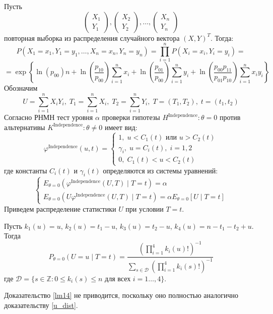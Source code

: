 Пусть
    $$
        \begin{pmatrix}
            X_1 \\
            Y_1 
        \end{pmatrix},
        \begin{pmatrix}
            X_2 \\
            Y_2
        \end{pmatrix}, \ldots,
        \begin{pmatrix}
            X_n \\
            Y_n
        \end{pmatrix}
    $$ повторная выборка из распределения случайного вектора $(X,Y)^T$. Тогда:
$$
    P(X_1=x_1,Y_1=y_1,\ldots,X_n=x_n,Y_n=y_n)
    =\prod_{i=1}^n P(X_i=x_i,Y_i=y_i) =
    $$
    $$
    =\exp \left\{ \ln(p_{00})n + 
        \ln \left(\dfrac{p_{10}}{p_{00}}\right) \sum_{i=1}^n x_i 
        +\ln \left(\dfrac{p_{01}}{p_{00}}\right) \sum_{i=1}^{n} y_i   +
        \ln\left(\dfrac{p_{00}p_{11}}{p_{01}p_{10}}\right) \sum_{i=1}^n x_i y_i 
     \right\}
    $$
    Обозначим 
    $$
    U = \sum_{i=1}^n X_i Y_i,\;
    T_1 = \sum_{i=1}^n X_i,\;
    T_2 = \sum_{i=1}^n Y_i, \;
    T=(T_1,T_2), \; t=(t_1,t_2)$$
    Согласно \cite{Lehmann1986} РНМН тест уровня $\alpha$ проверки гипотезы $H^{\text{Independence}}: \theta = 0$ против альтернативы $K^{\text{Independence}}: \theta \neq 0$ 
    имеет вид:
    $$
    \varphi^{\text{Independence}}(u,t)=\begin{cases}
        1, \; u<C_1(t) \text{ или } u>C_2(t)\\
        \gamma_i, \; u=C_i(t), \; i=1,2\\
        0, \; C_1(t)<u<C_2(t)
    \end{cases}
    $$
    где константы $C_i(t)$ и $\gamma_i(t)$ определяются из системы уравнений:
    $$
    \begin{cases}
        E_{\theta=0}(\varphi^{\text{Independence}}(U,T) \mid T=t)=\alpha \\
        E_{\theta=0}(U\varphi^{\text{Independence}}(U,T) \mid T=t)=\alpha E_{\theta=0}[U \mid T=t]
    \end{cases}
    $$
    Приведем распределение статистики $U$ при условии $T=t$.
\begin{lemma}\label{lm14}
    Пусть $k_1(u)=u$, $k_2(u)=t_1-u$, $k_3(u)=t_2-u$,
    $k_4(u)=n-t_1-t_2+u$.
        Тогда
        $$P_{\theta=0}(U=u \mid T=t)=\dfrac{(\prod_{i=1}^4 k_i(u)!)^{-1}}
            {\sum_{s\in \mathcal{D}} (\prod_{i=1}^4 k_i(s)!)^{-1}}$$
        где $\mathcal{D}=\{s \in \mathbb{Z}: 0\leq k_i(s) \leq n \text{ для всех } i=1\ldots,4\}$.
\end{lemma}
Доказательство \autoref{lm14} не приводится, поскольку оно полностью 
аналогично доказательству \autoref{u_dist}.

